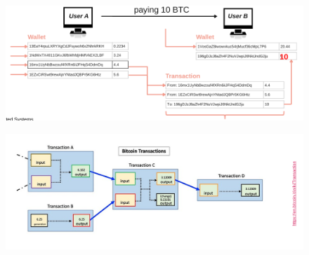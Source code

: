 \documentclass[../Main.tex]{subfiles}
\begin{document}
\begin{figure}[H]
    \centering
    \includegraphics[width=0.75\linewidth]{Images/blockchain/bitcoin-transaction.png}
\end{figure}
\begin{figure}[H]
    \centering
    \includegraphics[width=0.75\linewidth]{Images/blockchain/bitcoin-transaction2.png}
\end{figure}
\end{document}
